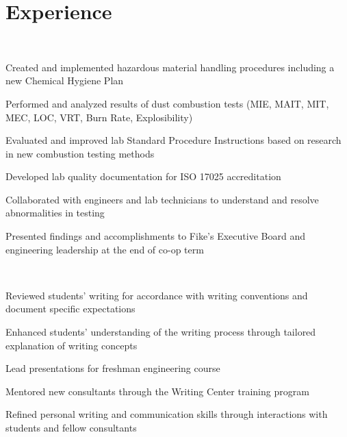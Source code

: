 \documentclass[]{deedy-resume-openfont}
\begin{document}
\begin{minipage}[t]{0.66\textwidth} 

\sectionsep
\section{Experience}
\sectionsep
{} 
\sectionsep \\
\vspace{\topsep} %
\begin{tightemize}
	\item Created and implemented hazardous material handling procedures including a new Chemical Hygiene Plan
	\item Performed and analyzed results of dust combustion tests (MIE, MAIT, MIT, MEC, LOC, VRT, Burn Rate, Explosibility)
	\item Evaluated and improved lab Standard Procedure Instructions based on research in new combustion testing methods 
	\item Developed lab quality documentation for ISO 17025 accreditation
	\item Collaborated with engineers and lab technicians to understand and resolve abnormalities in testing
	\item Presented findings and accomplishments to Fike's Executive Board and engineering leadership at the end of co-op term
\end{tightemize}
\sectionsep
\sectionsep
\sectionsep
{} 
\sectionsep\\
\begin{tightemize}
	\item Reviewed students' writing for accordance with writing conventions and document specific expectations
	\item Enhanced students' understanding of the writing process through tailored explanation of writing concepts
	\item Lead presentations for freshman engineering course
	\item Mentored new consultants through the Writing Center training program
	\item Refined personal writing and communication skills through interactions with students and fellow consultants

\end{tightemize}
\end{minipage}
\end{document}
